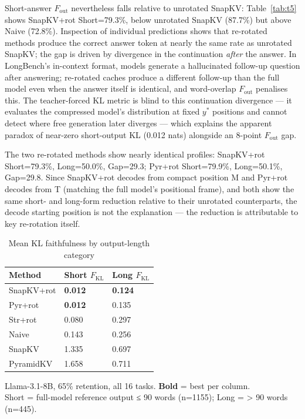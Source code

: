 \documentclass[10pt,letterpaper]{article}
\begin{document}
Short-answer \(F_{\text{out}}\) nevertheless falls relative to unrotated
SnapKV: Table~\ref{tab:t5} shows SnapKV+rot Short=79.3\%, below unrotated
SnapKV (87.7\%) but above Naive (72.8\%). Inspection of individual
predictions shows that re-rotated methods produce the correct answer token
at nearly the same rate as unrotated SnapKV; the gap is driven by
divergence in the continuation \emph{after} the answer. In LongBench's
in-context format, models generate a hallucinated follow-up question after
answering; re-rotated caches produce a different follow-up than the full
model even when the answer itself is identical, and word-overlap
\(F_{\text{out}}\) penalises this. The teacher-forced KL metric is blind to
this continuation divergence --- it evaluates the compressed model's
distribution at fixed \(y^*\) positions and cannot detect where free
generation later diverges --- which explains the apparent paradox of
near-zero short-output KL (0.012 nats) alongside an 8-point
\(F_{\text{out}}\) gap.

The two re-rotated methods show nearly identical profiles: SnapKV+rot
Short=79.3\%, Long=50.0\%, Gap=29.3; Pyr+rot Short=79.9\%, Long=50.1\%,
Gap=29.8. Since SnapKV+rot decodes from compact position M and Pyr+rot
decodes from T (matching the full model's positional frame), and both
show the same short- and long-form reduction relative to their unrotated
counterparts, the decode starting position is not the explanation ---
the reduction is attributable to key re-rotation itself.

\begin{table}[H]
\centering
\small
\caption{Mean KL faithfulness by output-length category}
\label{tab:t6}
\begin{tabular}{@{}lll@{}}
\toprule
Method & Short \(F_{\text{KL}}\) & Long \(F_{\text{KL}}\)\\
\midrule
SnapKV+rot & \textbf{0.012} & \textbf{0.124}\\
Pyr+rot & \textbf{0.012} & 0.135\\
Str+rot & 0.080 & 0.297\\
Naive & 0.143 & 0.256\\
SnapKV & 1.335 & 0.697\\
PyramidKV & 1.658 & 0.711\\
\bottomrule
\end{tabular}
\center
Llama-3.1-8B, 65\% retention, all 16 tasks. \textbf{Bold} = best per column.  
\\Short = full-model reference output ≤ 90 words (n=1155); Long =
\textgreater{} 90 words (n=445).
\end{table}
\end{document}
